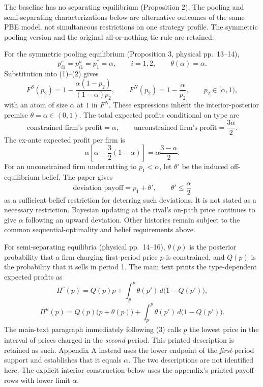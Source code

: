 \documentclass{article}
\begin{document}
The baseline has no separating equilibrium (Proposition 2). The pooling and semi-separating characterizations below are alternative outcomes of the same PBE model, not simultaneous restrictions on one strategy profile. The symmetric pooling version and the original all-or-nothing tie rule are retained.

For the symmetric pooling equilibrium (Proposition 3, physical pp.~13--14),
\[
p_{i1}^{c}=p_{i1}^{u}=p_1^{*}=\alpha,
\qquad i=1,2,
\qquad \theta(\alpha)=\alpha.
\]
Substitution into (1)--(2) gives
\[
F^{S}(p_2)=1-\frac{\alpha(1-p_2)}{(1-\alpha)p_2},
\qquad
F^{N}(p_2)=1-\frac{\alpha}{p_2},
\qquad p_2\in[\alpha,1),
\]
with an atom of size $\alpha$ at $1$ in $F^{N}$. These expressions inherit the interior-posterior premise $\theta=\alpha\in(0,1)$. The total expected profits conditional on type are
\[
\text{constrained firm's profit}=\alpha,
\qquad
\text{unconstrained firm's profit}=\frac{3\alpha}{2}.
\]
The ex-ante expected profit per firm is
\[
\alpha\left[\alpha+\frac{3}{2}(1-\alpha)\right]
 =\alpha\frac{3-\alpha}{2}.
\]
For an unconstrained firm undercutting to $p_1<\alpha$, let $\theta'$ be the induced off-equilibrium belief. The paper gives
\[
\text{deviation payoff}=p_1+\theta',
\qquad
\theta'\leq\frac{\alpha}{2}
\]
as a sufficient belief restriction for deterring such deviations. It is not stated as a necessary restriction. Bayesian updating at the rival's on-path price continues to give $\alpha$ following an upward deviation. Other histories remain subject to the common sequential-optimality and belief requirements above.

For semi-separating equilibria (physical pp.~14--16), $\theta(p)$ is the posterior probability that a firm charging first-period price $p$ is constrained, and $Q(p)$ is the probability that it sells in period 1. The main text prints the type-dependent expected profits as
\begin{equation}
\Pi^{c}(p)=Q(p)p+
\int_{\underline p}^{p}\theta(p')\,d\bigl(1-Q(p')\bigr),
\tag{3}
\end{equation}
\begin{equation}
\Pi^{u}(p)=Q(p)\bigl(p+\theta(p)\bigr)+
\int_{\underline p}^{p}\theta(p')\,d\bigl(1-Q(p')\bigr).
\tag{4}
\end{equation}
The main-text paragraph immediately following (3) calls $\underline p$ the lowest price in the interval of prices charged in the \emph{second} period. This printed description is retained as such. Appendix A instead uses the lower endpoint of the \emph{first}-period support and establishes that it equals $\alpha$. The two descriptions are not identified here. The explicit interior construction below uses the appendix's printed payoff rows with lower limit $\alpha$.
\end{document}
